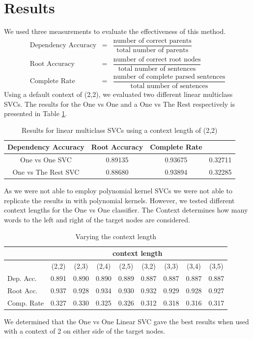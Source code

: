 \documentclass[12pt]{amsart}
\begin{document}
\section{Results}
 We used three measurements to evaluate the effectiveness of this method.
\begin{eqnarray*}
    \text{Dependency Accuracy} &=& \dfrac{\text{number of correct parents}}{\text{total number of parents}}\\
    \text{Root Accuracy} &=& \dfrac{\text{number of correct root nodes}}{\text{total number of sentences}}\\
    \text{Complete Rate} &=& \dfrac{\text{number of complete parsed sentences}}{\text{total number of sentences}}
\end{eqnarray*}
Using a default context of (2,2), we evaluated two different linear multiclass SVCs. The results for the One vs One and a One vs The Rest respectively is presented in Table \ref{key_results}.
\begin{table}
\label{key_results}
\caption{Results for linear multiclass SVCs using a context length of (2,2)}
        \begin{tabular}{c|ccc}
            \hline \hline Dependency Accuracy & Root Accuracy & Complete Rate \\ \hline
            One vs One SVC & 0.89135 & 0.93675 & 0.32711 \\
            One vs The Rest SVC & 0.88680 & 0.93894 & 0.32285 \\ \hline
        \end{tabular}
\end{table}
As we were not able to employ polynomial kernel SVCs we were not able to replicate the results in \cite{yamada2003statistical} with polynomial kernels. However, we tested different context lengths for the One vs One classifier. The Context determines how many words to the left and right of the target nodes are considered.
\begin{table}
\caption{Varying the context length}
\begin{tabular}{l|cccc|cccc}
  \hline \hline
&\multicolumn{8}{c}{context length} \\ \hline
             & (2,2) & (2,3) & (2,4) & (2,5) & (3,2) & (3,3) & (3,4) & (3,5) \\ \hline 
            Dep. Acc. & 0.891 & 0.890 & 0.890 & 0.889 & 0.887 & 0.887 & 0.887 & 0.887 \\
            Root Acc. & 0.937 & 0.928 & 0.934 & 0.930 & 0.932 & 0.929 & 0.928 & 0.927 \\
            Comp. Rate & 0.327 & 0.330 & 0.325 & 0.326 & 0.312 & 0.318 & 0.316 & 0.317 \\ \hline
\end{tabular}
\end{table}
We determined that the One vs One Linear SVC gave the best results when used with a context of 2 on either side of the target nodes. 
\end{document}
